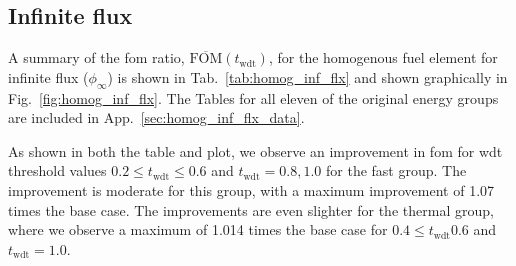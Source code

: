 \subsection{Infinite flux}
\label{sec:homog_inf_flx}

A summary of the \gls{fom} ratio,
$\overline{\mathrm{FOM}}(t_{\mathrm{wdt}})$, for the homogenous fuel
element for infinite flux ($\phi_{\infty}$) is shown in
Tab.~\ref{tab:homog_inf_flx} and shown graphically in
Fig.~\ref{fig:homog_inf_flx}. The Tables for all eleven of the
original energy groups are included in
App.~\ref{sec:homog_inf_flx_data}.

As shown in both the table and plot, we observe an improvement
in \gls{fom} for \gls{wdt} threshold values
$0.2 \leq t_{\mathrm{wdt}} \leq 0.6$ and $t_{\mathrm{wdt}} = 0.8, 1.0$ for
the fast group. The improvement is moderate for this
group, with a maximum improvement of 1.07 times the base case. The
improvements are even slighter for the thermal group, where we observe a
maximum of 1.014 times the base case for $0.4 \leq t_{\mathrm{wdt}} 0.6$ and $t_{\mathrm{wdt}} = 1.0$.

